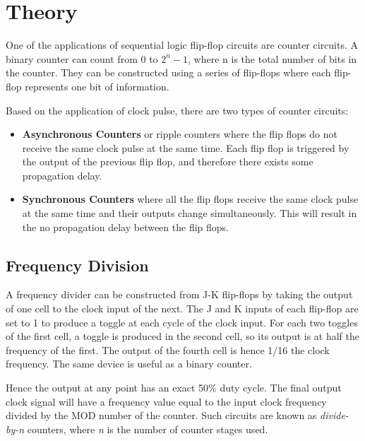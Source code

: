 \section{Theory}

One of the applications of sequential logic flip-flop circuits are counter circuits. 
A binary counter can count from $0$ to $2^n-1$, where n is the
total number of bits in the counter. They can be constructed using a series of flip-flops where each flip-flop represents one bit of information.

\noindent Based on the application of clock pulse, there are two types of counter circuits:

\begin{itemize}
    \item \textbf{Asynchronous Counters} or ripple counters where the flip flops do not receive the same clock pulse at the same time. Each flip flop is triggered by the output of the previous flip flop, and therefore there exists some propagation delay. 
    \item \textbf{Synchronous Counters} where all the flip flops receive the same clock pulse at the same time and their outputs change simultaneously. This will result in the no propagation delay between the flip flops.
\end{itemize}

\subsection*{Frequency Division}

A frequency divider can be constructed from J-K flip-flops by taking the output
of one cell to the clock input of the next. The J and K inputs of each flip-flop
are set to 1 to produce a toggle at each cycle of the clock input. For each two
toggles of the first cell, a toggle is produced in the second cell, so its
output is at half the frequency of the first. The output of the fourth cell is hence
1/16 the clock frequency. The same device is useful as a binary counter.

Hence the output at any point has an exact 50\% duty cycle. The final
output clock signal will have a frequency value equal to the input clock frequency
divided by the MOD number of the counter. Such circuits are known as \textit{divide-by-n} counters, where \textit{n} is the number of counter stages used.

